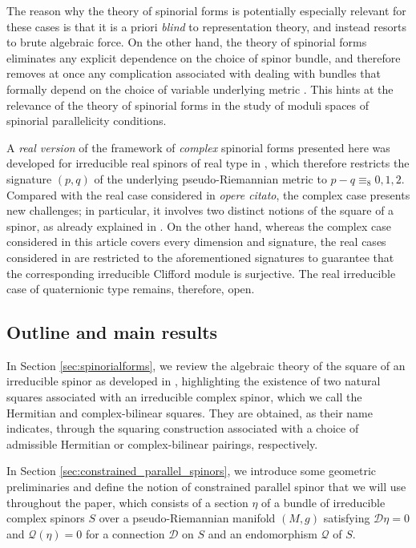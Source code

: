 \documentclass[10pt,a4paper,twoside,reqno]{amsart}
\theoremstyle{plain}
\theoremstyle{definition}
\theoremstyle{remark}
\def\cQ{\mathcal{Q}}
\def\cD{\mathcal{D}}
\begin{document}
The reason why the theory of spinorial forms is potentially especially relevant for these cases is that it is a priori \emph{blind} to representation theory, and instead resorts to brute algebraic force. On the other hand, the theory of spinorial forms eliminates any explicit dependence on the choice of spinor bundle, and therefore removes at once any complication associated with dealing with bundles that formally depend on the choice of variable underlying metric \cite{BGM05}. This hints at the relevance of the theory of spinorial forms in the study of moduli spaces of spinorial parallelicity conditions.\medskip

A \emph{real version} of the framework of \emph{complex} spinorial forms presented here was developed for irreducible real spinors of real type in \cite{CLS21,Sha24}, which therefore restricts the signature $(p,q)$ of the underlying pseudo-Riemannian metric to $p-q\equiv_8 0, 1, 2$. Compared with the real case considered in \emph{opere citato}, the complex case presents new challenges; in particular, it involves two distinct notions of the square of a spinor, as already explained in \cite{Algebraic_Complex_Square_2025}. On the other hand, whereas the complex case considered in this article covers every dimension and signature, the real cases considered in \cite{CLS21,Sha24} are restricted to the aforementioned signatures to guarantee that the corresponding irreducible Clifford module is surjective. The real irreducible case of quaternionic type remains, therefore, open.


\subsection*{Outline and main results}


In Section \ref{sec:spinorialforms}, we review the algebraic theory of the square of an irreducible spinor as developed in \cite{Algebraic_Complex_Square_2025}, highlighting the existence of two natural squares associated with an irreducible complex spinor, which we call the Hermitian and complex-bilinear squares. They are obtained, as their name indicates, through the squaring construction associated with a choice of admissible Hermitian or complex-bilinear pairings, respectively.\medskip

In Section \ref{sec:constrained_parallel_spinors}, we introduce some geometric preliminaries and define the notion of constrained parallel spinor that we will use throughout the paper, which consists of a section $\eta$ of a bundle of irreducible complex spinors $S$ over a pseudo-Riemannian manifold $(M,g)$ satisfying $\cD\eta = 0$ and $\cQ(\eta) = 0$ for a connection $\cD$ on $S$ and an endomorphism $\cQ$ of $S$.\medskip
\end{document}
